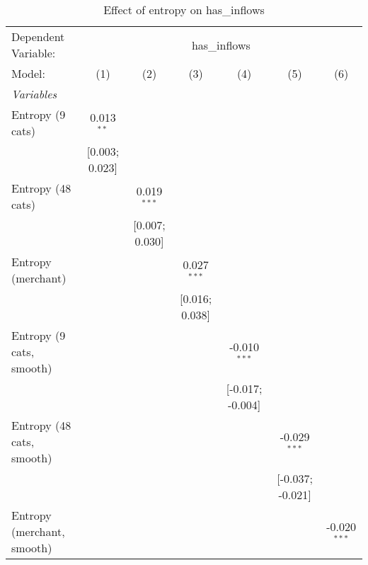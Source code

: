 
\begin{table}[htbp]
   \centering
   \tiny
   \begin{threeparttable}[b]
      \caption{\label{tab:reg_has_inflows} Effect of entropy on has\_inflows}
      \begin{tabular}{lcccccc}
         \tabularnewline \midrule \midrule
         Dependent Variable: & \multicolumn{6}{c}{has\_inflows}\\
         Model:                     & (1)            & (2)            & (3)            & (4)              & (5)              & (6)\\  
         \midrule
         \emph{Variables}\\
         Entropy (9 cats)           & 0.013$^{**}$   &                &                &                  &                  &   \\   
                                    & [0.003; 0.023] &                &                &                  &                  &   \\   
         Entropy (48 cats)          &                & 0.019$^{***}$  &                &                  &                  &   \\   
                                    &                & [0.007; 0.030] &                &                  &                  &   \\   
         Entropy (merchant)         &                &                & 0.027$^{***}$  &                  &                  &   \\   
                                    &                &                & [0.016; 0.038] &                  &                  &   \\   
         Entropy (9 cats, smooth)   &                &                &                & -0.010$^{***}$   &                  &   \\   
                                    &                &                &                & [-0.017; -0.004] &                  &   \\   
         Entropy (48 cats, smooth)  &                &                &                &                  & -0.029$^{***}$   &   \\   
                                    &                &                &                &                  & [-0.037; -0.021] &   \\   
         Entropy (merchant, smooth) &                &                &                &                  &                  & -0.020$^{***}$\\   

\end{tabular}
\end{threeparttable}
\end{table}

